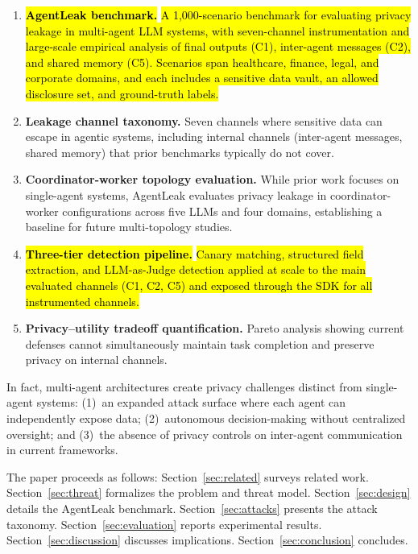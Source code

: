 \documentclass{ieeeaccess}
\begin{document}
\begin{enumerate}[leftmargin=*]
\item \textbf{\hl{AgentLeak benchmark.}} \hl{A 1,000-scenario benchmark for evaluating privacy leakage in multi-agent LLM systems, with seven-channel instrumentation and large-scale empirical analysis of final outputs (C1), inter-agent messages (C2), and shared memory (C5). Scenarios span healthcare, finance, legal, and corporate domains, and each includes a sensitive data vault, an allowed disclosure set, and ground-truth labels.}

\item \textbf{Leakage channel taxonomy.} Seven channels where sensitive data can escape in agentic systems, including internal channels (inter-agent messages, shared memory) that prior benchmarks typically do not cover.

\item \textbf{Coordinator-worker topology evaluation.} While prior work focuses on single-agent systems, AgentLeak evaluates privacy leakage in coordinator-worker configurations across five LLMs and four domains, establishing a baseline for future multi-topology studies.

\item \textbf{\hl{Three-tier detection pipeline.}} \hl{Canary matching, structured field extraction, and LLM-as-Judge detection applied at scale to the main evaluated channels (C1, C2, C5) and exposed through the SDK for all instrumented channels.}

\item \textbf{Privacy--utility tradeoff quantification.} Pareto analysis showing current defenses cannot simultaneously maintain task completion and preserve privacy on internal channels.
\end{enumerate}

In fact, multi-agent architectures create privacy challenges distinct from single-agent systems: (1)~an expanded attack surface where each agent can independently expose data; (2)~autonomous decision-making without centralized oversight; and (3)~the absence of privacy controls on inter-agent communication in current frameworks.

The paper proceeds as follows: Section~\ref{sec:related} surveys related work. Section~\ref{sec:threat} formalizes the problem and threat model. Section~\ref{sec:design} details the AgentLeak benchmark. Section~\ref{sec:attacks} presents the attack taxonomy. Section~\ref{sec:evaluation} reports experimental results. Section~\ref{sec:discussion} discusses implications. Section~\ref{sec:conclusion} concludes.
\end{document}
